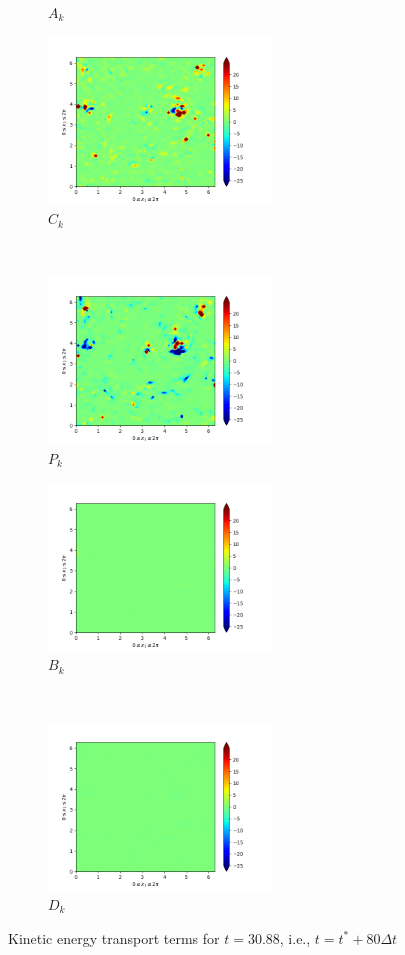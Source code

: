 \begin{figure}[H]
\begin{subfigure}{0.45\textwidth}
        \caption{$A_{k}$}
    \end{subfigure}
    \newline
    \begin{subfigure}{0.45\textwidth}
        \includegraphics[height=1.75in]{media/run-cds-65/C-ke-1420.png}
        \caption{$C_{k}$}
    \end{subfigure}
    ~
    \begin{subfigure}{0.45\textwidth}
        \includegraphics[height=1.75in]{media/run-cds-65/P-ke-1420.png}
        \caption{$P_{k}$}
    \end{subfigure}
    \newline
    \begin{subfigure}{0.45\textwidth}
        \includegraphics[height=1.75in]{media/run-cds-65/B-ke-1420.png}
        \caption{$B_{k}$}
    \end{subfigure}
    ~
    \begin{subfigure}{0.45\textwidth}
        \includegraphics[height=1.75in]{media/run-cds-65/D-ke-1420.png}
        \caption{$D_{k}$}
    \end{subfigure}
    \caption{Kinetic energy transport terms for $t=30.88$, i.e., $t=t^{\ast} + 80 \Delta t$}
\end{figure}
